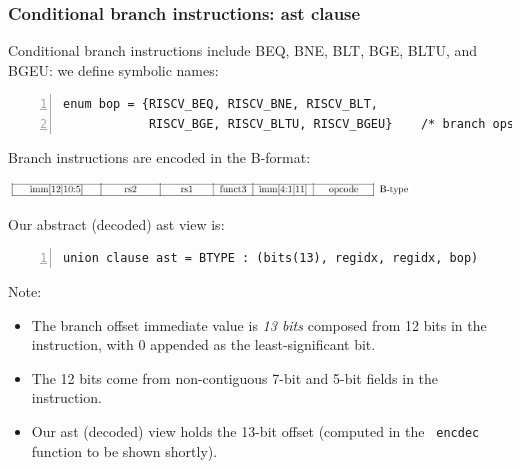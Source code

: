 \documentclass[aspectratio=169]{beamer}
\newcommand{\slidefont}{\scriptsize}
\newcommand{\cf}{\scriptsize\tt}
\begin{document}
\begin{frame}[fragile]
  \frametitle{Conditional branch instructions: ast clause}

  \slidefont

  Conditional branch instructions include BEQ, BNE, BLT, BGE, BLTU,
  and BGEU: we define symbolic names:

  \vspace{1ex}

  \begin{Verbatim}[frame=single, numbers=left, label = File riscv\_types.sail]
enum bop = {RISCV_BEQ, RISCV_BNE, RISCV_BLT,
            RISCV_BGE, RISCV_BLTU, RISCV_BGEU}    /* branch ops */
  \end{Verbatim}

  Branch instructions are encoded in the B-format:

  \begin{center}
    \includegraphics[width=0.8\textwidth]{Figures/Fig_RISCV_B_format.png}
  \end{center}

  Our abstract (decoded) ast view is:

  \vspace{1ex}

  \begin{Verbatim}[frame=single, numbers=left, label = File riscv\_insts\_base.sail]
union clause ast = BTYPE : (bits(13), regidx, regidx, bop)
  \end{Verbatim}

  \begin{minipage}{\textwidth}
    Note:
    \begin{itemize}
    \item The branch offset immediate value is \emph{13 bits}
      composed from 12 bits in the instruction, with 0 appended as
      the least-significant bit.

    \item The 12 bits come from non-contiguous 7-bit and 5-bit fields in the instruction.

    \item Our ast (decoded) view holds the 13-bit offset (computed in the {\cf
      encdec} function to be shown shortly).
    \end{itemize}
  \end{minipage}

\end{frame}
\end{document}
